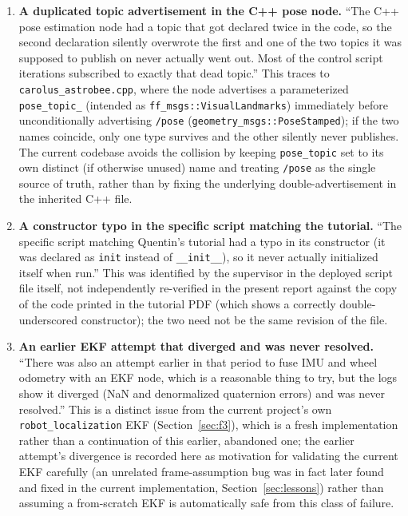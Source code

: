\documentclass[11pt]{article}
\begin{document}
\begin{enumerate}
  \item \textbf{A duplicated topic advertisement in the C++ pose node.}
  ``The C++ pose estimation node had a topic that got declared twice in the
  code, so the second declaration silently overwrote the first and one of
  the two topics it was supposed to publish on never actually went out. Most
  of the control script iterations subscribed to exactly that dead topic.''
  This traces to \texttt{carolus\_astrobee.cpp}, where the node
  advertises a parameterized \texttt{pose\_topic\_} (intended as
  \texttt{ff\_msgs::VisualLandmarks}) immediately before unconditionally
  advertising \texttt{/pose} (\texttt{geometry\_msgs::PoseStamped}); if the
  two names coincide, only one type survives and the other silently never
  publishes. The current codebase avoids the collision by keeping
  \texttt{pose\_topic} set to its own distinct (if otherwise unused) name
  and treating \texttt{/pose} as the single source of truth, rather than by
  fixing the underlying double-advertisement in the inherited C++ file.
  \item \textbf{A constructor typo in the specific script matching the
  tutorial.} ``The specific script matching Quentin's tutorial had a typo
  in its constructor (it was declared as \texttt{init} instead of
  \texttt{\_\_init\_\_}), so it never actually initialized itself when
  run.'' This was identified by the supervisor in the deployed script file
  itself, not independently re-verified in the present report against the
  copy of the code printed in the tutorial PDF (which shows a correctly
  double-underscored constructor); the two need not be the same revision of
  the file.
  \item \textbf{An earlier EKF attempt that diverged and was never
  resolved.} ``There was also an attempt earlier in that period to fuse IMU
  and wheel odometry with an EKF node, which is a reasonable thing to try,
  but the logs show it diverged (NaN and denormalized quaternion errors)
  and was never resolved.'' This is a distinct issue from the current
  project's own \texttt{robot\_localization} EKF (Section~\ref{sec:f3}),
  which is a fresh implementation rather than a continuation of this
  earlier, abandoned one; the earlier attempt's divergence is recorded here
  as motivation for validating the current EKF carefully (an unrelated
  frame-assumption bug was in fact later found and fixed in the current
  implementation, Section~\ref{sec:lessons}) rather than assuming a
  from-scratch EKF is automatically safe from this class of failure.

\end{enumerate}
\end{document}
